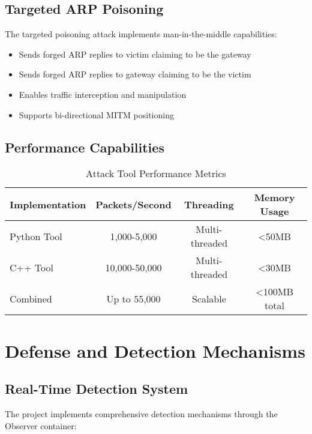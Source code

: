 \documentclass[12pt,a4paper]{article}
\begin{document}
\subsection{Targeted ARP Poisoning}

The targeted poisoning attack implements man-in-the-middle capabilities:
\begin{itemize}
    \item Sends forged ARP replies to victim claiming to be the gateway
    \item Sends forged ARP replies to gateway claiming to be the victim
    \item Enables traffic interception and manipulation
    \item Supports bi-directional MITM positioning
\end{itemize}

\subsection{Performance Capabilities}

\begin{table}[H]
\centering
\caption{Attack Tool Performance Metrics}
\begin{tabular}{|l|c|c|c|}
\hline
\textbf{Implementation} & \textbf{Packets/Second} & \textbf{Threading} & \textbf{Memory Usage} \\
\hline
Python Tool & 1,000-5,000 & Multi-threaded & <50MB \\
\hline
C++ Tool & 10,000-50,000 & Multi-threaded & <30MB \\
\hline
Combined & Up to 55,000 & Scalable & <100MB total \\
\hline
\end{tabular}
\end{table}

\section{Defense and Detection Mechanisms}

\subsection{Real-Time Detection System}

The project implements comprehensive detection mechanisms through the Observer container:
\end{document}

